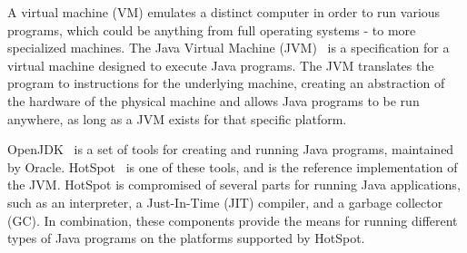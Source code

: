 
A virtual machine (VM) emulates a distinct computer in order to run various programs, which could be anything from full operating systems - to more specialized machines. The Java Virtual Machine (JVM)~\cite{JVM} is a specification for a virtual machine designed to execute Java programs. The JVM translates the program to instructions for the underlying machine, creating an abstraction of the hardware of the physical machine and allows Java programs to be run anywhere, as long as a JVM exists for that specific platform. 

OpenJDK~\cite{openjdk} is a set of tools for creating and running Java programs, maintained by Oracle. HotSpot~\cite{hotspot} is one of these tools, and is the reference implementation of the JVM. HotSpot is compromised of several parts for running Java applications, such as an interpreter, a Just-In-Time (JIT) compiler, and a garbage collector (GC). In combination, these components provide the means for running different types of Java programs on the platforms supported by HotSpot.


